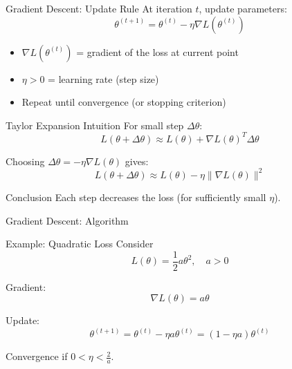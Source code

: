 \documentclass[../../main.tex]{subfiles}
\begin{document}
\begin{frame}{Gradient Descent: Update Rule}
At iteration $t$, update parameters:
\[
\theta^{(t+1)} = \theta^{(t)} - \eta \nabla L(\theta^{(t)})
\]

\begin{itemize}
    \item $\nabla L(\theta^{(t)})$ = gradient of the loss at current point
    \item $\eta > 0$ = learning rate (step size)
    \item Repeat until convergence (or stopping criterion)
\end{itemize}
\end{frame}

\begin{frame}{Taylor Expansion Intuition}
For small step $\Delta \theta$:
\[
L(\theta + \Delta \theta) \approx L(\theta) 
+ \nabla L(\theta)^T \Delta \theta
\]

Choosing $\Delta \theta = - \eta \nabla L(\theta)$ gives:
\[
L(\theta + \Delta \theta) 
\approx L(\theta) - \eta \|\nabla L(\theta)\|^2
\]

\begin{block}{Conclusion}
Each step decreases the loss (for sufficiently small $\eta$).
\end{block}
\end{frame}

\begin{frame}{Gradient Descent: Algorithm}
\begin{algorithm}[H]
\SetAlgoLined
{}
\end{algorithm}
\end{frame}

\begin{frame}{Example: Quadratic Loss}
Consider 
\[
L(\theta) = \frac{1}{2} a \theta^2, \quad a > 0
\]

Gradient:
\[
\nabla L(\theta) = a\theta
\]

Update:
\[
\theta^{(t+1)} = \theta^{(t)} - \eta a \theta^{(t)} 
= (1 - \eta a)\theta^{(t)}
\]

Convergence if $0 < \eta < \frac{2}{a}$.
\end{frame}
\end{document}

